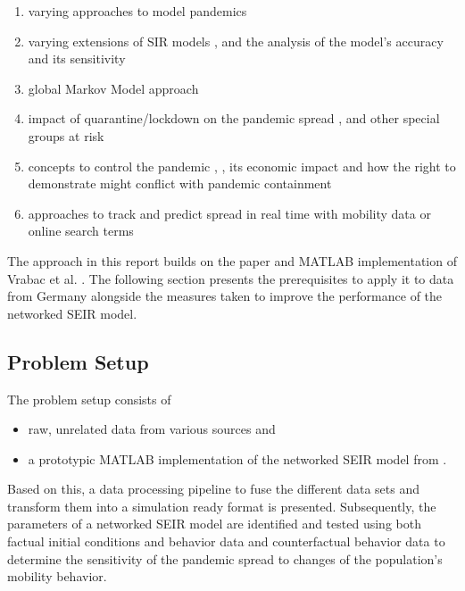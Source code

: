 \begin{enumerate}
	\item varying approaches to model pandemics \cite{zinoAnalysisPredictionControl2021}
	\item varying extensions of SIR models \cite{liuNewSEAIRDPandemic2021}, \cite{ramosSimpleComplexEnough2021} and the analysis of the model's accuracy and its sensitivity \cite{khoshnawQuantitativeQualitativeAnalysis2020}
 	\item global Markov Model approach \cite{frihiToolboxSimulateMitigate2021}
	\item impact of quarantine/lockdown on the pandemic spread \cite{wellsOptimalCOVID19Quarantine2021}, \cite{memonAssessingRoleQuarantine2021} and other special groups at risk \cite{kouidereOptimalControlMathematical2021}
	\item concepts to control the pandemic \cite{pintonetoMathematicalModelCOVID192021}, \cite{aravindakshanPreparingFutureCOVID192020}, its economic impact \cite{caulkinsOptimalLockdownIntensity2021} and how the right to demonstrate might conflict with pandemic containment \cite{langeSpreadingDiseaseProtest2021}
	\item approaches to track and predict spread in real time with mobility data \cite{leungRealtimeTrackingPrediction2021} or online search terms \cite{lamposTrackingCOVID19Using2021}
\end{enumerate}

The approach in this report builds on the paper and MATLAB implementation of Vrabac et al. \cite{vrabacCapturingEffectsTransportation2020}. The following section presents the prerequisites to apply it to data from Germany alongside the measures taken to improve the performance of the networked SEIR model.

\subsection{Problem Setup}
The problem setup consists of

\begin{itemize}
	\item raw, unrelated data from various sources and
	\item a prototypic MATLAB implementation of the networked SEIR model from \cite{vrabacCapturingEffectsTransportation2020}.
\end{itemize}

Based on this, a data processing pipeline to fuse the different data sets and transform them into a simulation ready format is presented. Subsequently, the parameters of a networked SEIR model are identified and tested using both factual initial conditions and behavior data and counterfactual behavior data to determine the sensitivity of the pandemic spread to changes of the population's mobility behavior.
